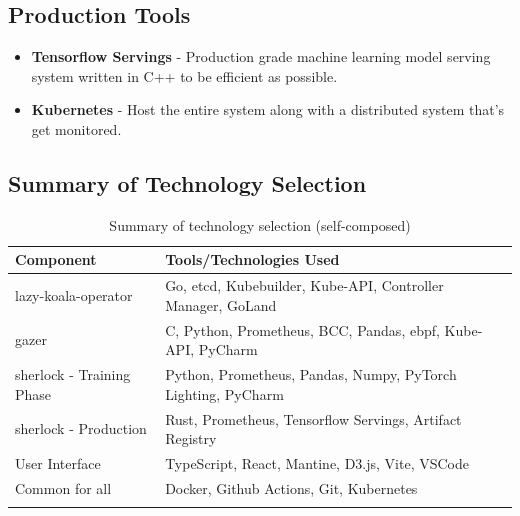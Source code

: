 \subsection{Production Tools}
\begin{itemize}
    \item \textbf{Tensorflow Servings} - Production grade machine learning model serving system written in C++ to be efficient as possible.
    \item \textbf{Kubernetes} - Host the entire system along with a distributed system that's get monitored.
\end{itemize}

\subsection{Summary of Technology Selection}

\begin{longtable}{|p{43mm}|p{110mm}|}
    \hline
    \textbf{Component} &
    \textbf{Tools/Technologies Used} \\ \hline

    \ac{lazy-koala-operator} &
    Go, etcd, Kubebuilder, Kube-API, Controller Manager, GoLand \\ \hline

    \ac{gazer} &
    C, Python, Prometheus, BCC, Pandas, \ac{ebpf}, Kube-API, PyCharm \\ \hline

    \ac{sherlock} - Training Phase &
    Python, Prometheus, Pandas, Numpy, PyTorch Lighting, PyCharm \\ \hline

    \ac{sherlock} - Production &
    Rust, Prometheus, Tensorflow Servings, Artifact Registry \\ \hline

    User Interface &
    TypeScript, React, Mantine, D3.js, Vite, VSCode \\ \hline

    Common for all &
    Docker, Github Actions, Git, Kubernetes \\ \hline

    \caption{Summary of technology selection (self-composed)}
\end{longtable}